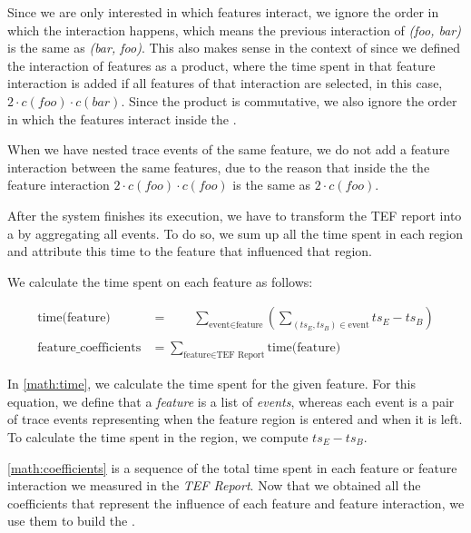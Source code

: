 Since we are only interested in which features interact, we ignore the order in which the interaction happens, which means the previous
interaction of \emph{(foo, bar)} is the same as \emph{(bar, foo)}. This also makes sense in the context of {\perfInfluenceModel} since we defined
the interaction of features as a product, where the time spent in that feature interaction is added if all features of that interaction are selected,
in this case, $2 \cdot c(foo) \cdot c(bar)$. Since the product is commutative, we also ignore the order in which the features interact inside the \perfInfluenceModel.

When we have nested trace events of the same feature, we do not add a feature interaction between the same features, 
due to the reason that inside the {\perfInfluenceModel} the feature interaction $2 \cdot c(foo) \cdot c(foo)$ is the same as $2 \cdot c(foo)$.

After the system finishes its execution, we have to transform the TEF report into a {\perfInfluenceModel} by aggregating all events. 
To do so, we sum up all the time spent in each region and attribute this time to the feature that influenced that region. 

We calculate the time spent on each feature as follows:


\begin{align}
    \text{time(feature)} &= \textit{ }\textit{ }\textit{ } \sum_{\text{event} \in \text{feature}} \left( \sum_{(ts_E, ts_B) \in \text{event}} ts_E - ts_B \right) \label{math:time} \\ \nonumber \\
    \text{feature\_coefficients} &= \sum_{\text{feature} \in \text{TEF Report}}\text{time(feature)} \label{math:coefficients}
\end{align}

In \autoref{math:time}, we calculate the time spent for the given feature. 
For this equation, we define that a \textit{feature} is a list of \textit{events}, 
whereas each event is a pair of trace events representing when the feature region is entered and when it is left. 
To calculate the time spent in the region, we compute $ts_E - ts_B$.

\autoref{math:coefficients} is a sequence of the total time spent in each feature or feature interaction we measured in the \textit{TEF Report}. 
Now that we obtained all the coefficients that represent the influence of each feature and feature interaction, we use them to build the \perfInfluenceModel.
